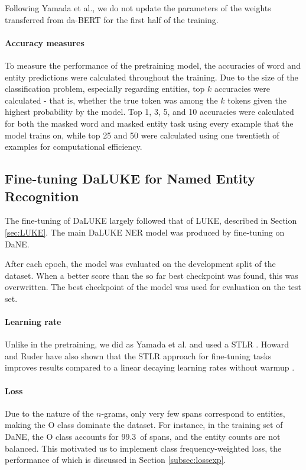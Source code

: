 \documentclass[main.tex]{subfiles}
\begin{document}
Following Yamada et al., we do not update the parameters of the weights transferred from da-BERT for the first half of the training.
\paragraph{Accuracy measures}
To measure the performance of the pretraining model, the accuracies of word and entity predictions were calculated throughout the training.
Due to the size of the classification problem, especially regarding entities, top $ k $ accuracies were calculated - that is, whether the true token was among the $ k $ tokens given the highest probability by the model.
Top 1, 3, 5, and 10 accuracies were calculated for both the masked word and masked entity task using every example that the model trains on, while top 25 and 50 were calculated using one twentieth of examples for computational efficiency.

\subsection{Fine-tuning DaLUKE for Named Entity Recognition}%
\label{sub:fine-tune-ner}
The fine-tuning of DaLUKE largely followed that of LUKE, described in Section \ref{sec:LUKE}.
The main DaLUKE NER model was produced by fine-tuning on DaNE.

After each epoch, the model was evaluated on the development split of the dataset.
When a better score than the so far best checkpoint was found, this was overwritten.
The best checkpoint of the model was used for evaluation on the test set.

\paragraph{Learning rate}
Unlike in the pretraining, we did as Yamada et al. and used a STLR \cite{yamada2020luke}.
Howard and Ruder have also shown that the STLR approach for fine-tuning tasks improves results compared to a linear decaying learning rates without warmup \cite{howardruder2018universal}.

\paragraph{Loss}
Due to the nature of the $ n $-grams, only very few spans correspond to entities, making the O class dominate the dataset.
For instance, in the training set of DaNE, the O class accounts for 99.3\pro\ of spans, and the entity counts are not balanced.
This motivated us to implement class frequency-weighted loss, the performance of which is discussed in Section \ref{subsec:lossexp}.
\end{document}

